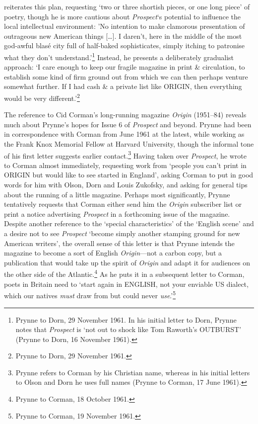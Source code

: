 \documentclass[]{article}
\begin{document}
reiterates this plan, requesting ‘two or three shortish pieces, or one
long piece’ of poetry, though he is more cautious about
\emph{Prospect}‘s potential to influence the local intellectual
environment: ’No intention to make clamorous presentation of outrageous
new American things {[}\ldots{}{]}. I daren’t, here in the middle of the
most god-awful blasé city full of half-baked sophisticates, simply
itching to patronise what they don’t understand.’\footnote{Prynne to
  Dorn, 29 November 1961. In his initial letter to Dorn, Prynne notes
  that \emph{Prospect} is ‘not out to shock like Tom Raworth’s OUTBURST’
  (Prynne to Dorn, 16 November 1961).} Instead, he presents a
deliberately gradualist approach: ‘I care enough to keep our fragile
magazine in print \& circulation, to establish some kind of firm ground
out from which we can then perhaps venture somewhat further. If I had
cash \& a private list like ORIGIN, then everything would be very
different.’\footnote{Prynne to Dorn, 29 November 1961.}

The reference to Cid Corman’s long-running magazine \emph{Origin}
(1951–84) reveals much about Prynne’s hopes for Issue 6 of
\emph{Prospect} and beyond. Prynne had been in correspondence with
Corman from June 1961 at the latest, while working as the Frank Knox
Memorial Fellow at Harvard University, though the informal tone of his
first letter suggests earlier contact.\footnote{Prynne refers to Corman
  by his Christian name, whereas in his initial letters to Olson and
  Dorn he uses full names (Prynne to Corman, 17 June 1961).} Having
taken over \emph{Prospect}, he wrote to Corman almost immediately,
requesting work from ‘people you can’t print in ORIGIN but would like to
see started in England’, asking Corman to put in good words for him with
Olson, Dorn and Louis Zukofsky, and asking for general tips about the
running of a little magazine. Perhaps most significantly, Prynne
tentatively requests that Corman either send him the \emph{Origin}
subscriber list or print a notice advertising \emph{Prospect} in a
forthcoming issue of the magazine. Despite another reference to the
‘special characteristics’ of the ‘English scene’ and a desire not to see
\emph{Prospect} ‘become simply another stamping ground for new American
writers’, the overall sense of this letter is that Prynne intends the
magazine to become a sort of English \emph{Origin}—not a carbon copy,
but a publication that would take up the spirit of \emph{Origin} and
adapt it for audiences on the other side of the Atlantic.\footnote{Prynne
  to Corman, 18 October 1961.} As he puts it in a subsequent letter to
Corman, poets in Britain need to ‘start again in ENGLISH, not your
enviable US dialect, which our natives \emph{must} draw from but could
never \emph{use}.’\footnote{Prynne to Corman, 19 November 1961.}
\end{document}
